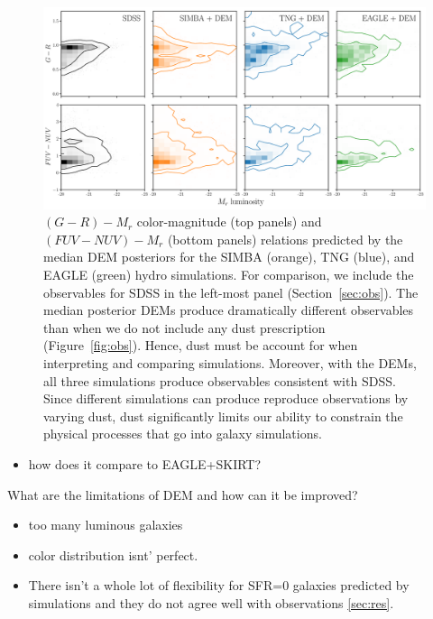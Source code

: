 \begin{figure}
\begin{center}
    \includegraphics[width=\textwidth]{figs/abc_observables.pdf}
    \caption{\label{fig:dem}
    $(G-R) - M_r$ color-magnitude (top panels) and $(FUV-NUV) - M_r$ (bottom
    panels) relations predicted by the median DEM posteriors for the SIMBA
    (orange), TNG (blue), and EAGLE (green) hydro simulations. For comparison, 
    we include the observables for SDSS in the left-most panel
    (Section~\ref{sec:obs}). The median posterior DEMs produce dramatically 
    different observables than when we do not include any dust prescription
    (Figure~\ref{fig:obs}). Hence, dust must be account for when interpreting 
    and comparing simulations. Moreover, with the DEMs, all three simulations
    produce observables consistent with SDSS. Since different simulations can 
    produce reproduce observations by varying dust, dust significantly limits
    our ability to constrain the physical processes that go into galaxy
    simulations. 
    }
\end{center}
\end{figure}

\begin{itemize}
    \item how does it compare to EAGLE+SKIRT? 
\end{itemize}
What are the limitations of DEM and how can it be improved? 
\begin{itemize}
    \item too many luminous galaxies
    \item color distribution isnt' perfect. 
    \item There isn't a whole lot of flexibility for SFR=0 galaxies predicted by
    simulations and they do not agree well with observations \ref{sec:res}. 
\end{itemize}



